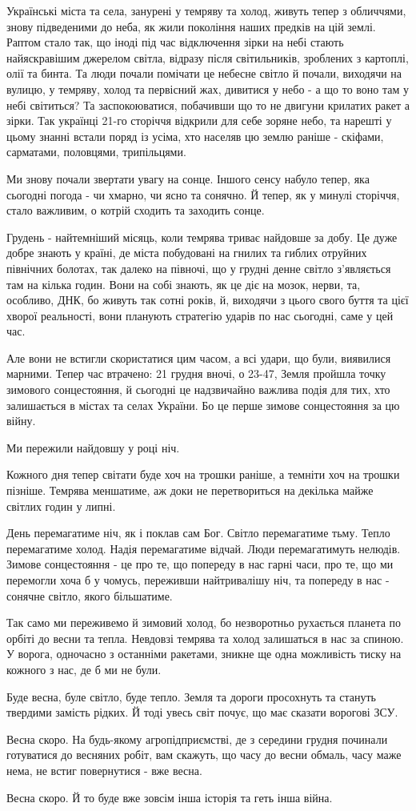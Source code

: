 Українські міста та села, занурені у темряву та холод, живуть тепер з
обличчями, знову підведеними до неба, як жили покоління наших предків на цій
землі. Раптом стало так, що іноді під час відключення зірки на небі стають
найяскравішим джерелом світла, відразу після світильників, зроблених з
картоплі, олії та бинта. Та люди почали помічати це небесне світло й почали,
виходячи на вулицю, у темряву, холод та первісний жах, дивитися у небо - а що
то воно там у небі світиться? Та заспокоюватися, побачивши що то не двигуни
крилатих ракет а зірки. Так українці 21-го сторіччя відкрили для себе зоряне
небо, та нарешті у цьому знанні встали поряд із усіма, хто населяв цю землю
раніше - скіфами, сарматами, половцями,  трипільцями.

Ми знову почали звертати увагу на сонце. Іншого сенсу набуло тепер, яка
сьогодні погода - чи хмарно, чи ясно та сонячно. Й тепер, як у минулі сторіччя,
стало важливим, о котрій сходить та заходить сонце.

Грудень - найтемніший місяць, коли темрява триває найдовше за добу.  Це дуже
добре знають у країні, де міста побудовані на гнилих та гиблих отруйних
північних болотах, так далеко на півночі, що у грудні  денне світло з'являється
там на кілька годин. Вони на собі знають, як це діє на мозок, нерви, та,
особливо, ДНК,  бо живуть так сотні років, й, виходячи з цього свого буття та
цієї хворої реальності, вони планують стратегію ударів по нас сьогодні, саме у
цей час.

Але вони не встигли скористатися цим часом, а всі удари, що були, виявилися
марними. Тепер час втрачено: 21 грудня вночі, о 23-47, Земля пройшла точку
зимового сонцестояння, й сьогодні це надзвичайно важлива подія для тих, хто
залишається в містах та селах України. Бо це перше зимове сонцестояння за цю
війну. 

Ми пережили найдовшу у році ніч. 

Кожного дня тепер світати буде хоч на трошки раніше, а темніти хоч на трошки
пізніше. Темрява меншатиме, аж доки не перетвориться на декілька майже світлих
годин у липні.

День перемагатиме ніч, як і поклав сам Бог. Світло перемагатиме тьму. Тепло
перемагатиме холод. Надія перемагатиме відчай. Люди перемагатимуть нелюдів.
Зимове сонцестояння - це про те, що попереду в нас гарні часи, про те, що ми
перемогли хоча б у чомусь, переживши найтривалішу ніч, та попереду в нас -
сонячне світло, якого більшатиме.

Так само ми переживемо й зимовий холод, бо незворотньо рухається планета по
орбіті до весни та тепла. Невдовзі темрява та холод залишаться в нас за спиною.
У ворога, одночасно з останніми ракетами, зникне ще одна можливість тиску на
кожного з нас, де б ми не були. 

Буде весна, буле світло, буде тепло. Земля та дороги просохнуть та стануть
твердими замість рідких. Й тоді увесь світ почує, що має сказати ворогові ЗСУ.

Весна скоро. На будь-якому агропідприємстві, де з середини грудня починали
готуватися до весняних робіт, вам скажуть, що часу до весни обмаль, часу маже
нема, не встиг повернутися - вже весна.

Весна скоро. Й то буде вже зовсім інша історія та геть інша війна.
